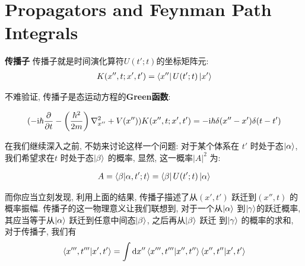 \section{Propagators and Feynman Path Integrals}

\begin{definition}{\bf 传播子}
  传播子就是时间演化算符$U(t'; t)$的坐标矩阵元:
  \begin{equation}
    \begin{aligned}
      K(x'', t; x', t') = \bra{x''} U(t'; t) \ket{x'}
    \end{aligned}
  \end{equation}
\end{definition}

不难验证, 传播子是态运动方程的{\bf Green函数}:

\begin{equation}
  \begin{aligned}
    (- {\rm i} \hbar \pdv{}{t} - \left(\frac{\hbar^{2}}{2m}\right)\nabla_{x''}^{2} + V(x''))K(x'', t; x', t') = - {\rm i} \hbar \delta(x''-x') \delta(t-t')
  \end{aligned}
\end{equation}

在我们继续深入之前, 不妨来讨论这样一个问题: 对于某个体系在 $t'$ 时处于态$\ket{\alpha}$,
我们希望求在$t$ 时处于态$\ket{\beta}$ 的概率, 显然, 这一概率$|A|^{2}$ 为:

\begin{equation}
  \begin{aligned}
    A = \bra{\beta}\ket{\alpha, t';t} = \bra{\beta}U(t'; t) \ket{\alpha}
  \end{aligned}
\end{equation}

而你应当立刻发现, 利用上面的结果, 传播子描述了从$(x', t')$ 跃迁到$(x'', t)$ 的概率振幅.
传播子的这一物理意义让我们联想到, 对于一个从$\ket{\alpha}$ 到$\ket{\gamma}$的跃迁概率,
其应当等于从$\ket{\alpha}$ 跃迁到任意中间态$\ket{\beta}$, 之后再从$\ket{\beta}$ 跃迁
到$\ket{\gamma}$ 的概率的求和, 对于传播子, 我们有
\begin{equation}
  \begin{aligned}
    \bra{x''', t'''}\ket{x', t'} = \int \dd x'' \bra{x''', t'''}\ket{x'', t''}\bra{x'', t''} \ket{x', t'}
  \end{aligned}
\end{equation}

